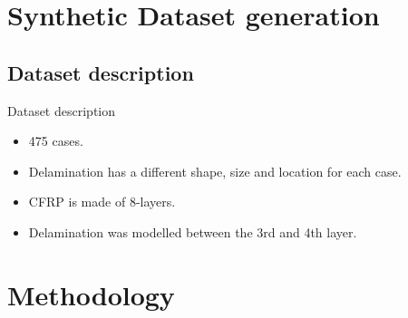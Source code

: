 \documentclass[10pt,aspectratio=169]{beamer} %
\begin{document}
\section{Synthetic Dataset generation}
\subsection{Dataset description}
\setcounter{subfigure}{0}
\begin{frame}{Dataset description}
	\centering
	\begin{minipage}[c]{0.35\textwidth}
		\begin{itemize}
			\justifying
			\item 475 cases.
			\item Delamination has a different shape, size and location for each case.
			\item CFRP is made of 8-layers.
			\item Delamination was modelled between the 3rd and 4th layer.			
		\end{itemize}
	\end{minipage}
	\hfill
	\begin{minipage}[c]{0.6\textwidth}
		\begin{figure}
			\centering			
			\qquad
		\end{figure}
	\end{minipage}
\end{frame}

\section{Methodology}
\end{document}

